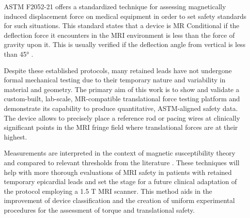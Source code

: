 ASTM F2052-21 offers a standardized technique for assessing magnetically induced displacement force on medical equipment in order to set safety standards for such situations. This standard states that a device is MR Conditional if the deflection force it encounters in the MRI environment is less than the force of gravity upon it. This is usually verified if the deflection angle from vertical is less than 45° \citep{stoianovici2024,astmF2052}.

Despite these established protocols, many retained leads have not undergone formal mechanical testing due to their temporary nature and variability in material and geometry.  The primary aim of this work is to show and validate a custom-built, lab-scale, MR-compatible translational force testing platform and demonstrate its capability to produce quantitative, ASTM-aligned safety data. The device allows to precisely place a reference rod or pacing wires at clinically significant points in the MRI fringe field where translational forces are at their highest. 

Measurements are interpreted in the context of magnetic susceptibility theory and compared to relevant thresholds from the literature \citep{haddixProposal,astmF2052}. These techniques will help with more thorough evaluations of MRI safety in patients with retained temporary epicardial leads and set the stage for a future clinical adaptation of the protocol employing a 1.5 T MRI scanner. This method aids in the improvement of device classification and the creation of uniform experimental procedures for the assessment of torque and translational safety.